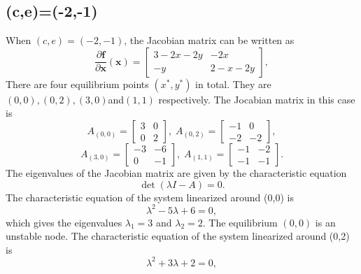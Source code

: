 \documentclass[a4paper,twocolumn]{article} %
\begin{document}
\subsection{(c,e)=(-2,-1)}
When $(c,e)=(-2,-1)$, the Jacobian matrix can be written as
\begin{equation*}
    \frac{\partial\textbf{f}}{\partial \textbf{x}}(\textbf{x}) =
    \left[\begin{array}{cc}
    3-2x-2y & -2x \\
    -y & 2-x-2y
    \end{array}\right],
\end{equation*}
There are four equilibrium points $(x^*,y^*)$ in total. They are $(0,0),(0,2),(3,0)$and$(1,1)$ respectively. The Jocabian matrix in this case is
\begin{equation*}
    A_{(0,0)} =
    \left[\begin{array}{cc}
    3 & 0 \\
    0 & 2
    \end{array}\right], \; A_{(0,2)} =
    \left[\begin{array}{cc}
    -1 & 0 \\
    -2 & -2
    \end{array}\right],   
    \end{equation*}
    \begin{equation*}
    A_{(3,0)} =
    \left[\begin{array}{cc}
    -3 & -6 \\
    0 & -1
    \end{array}\right], \;A_{(1,1)} =
    \left[\begin{array}{cc}
    -1 & -2 \\
    -1 & -1
    \end{array}\right].
\end{equation*}
The eigenvalues of the Jacobian matrix are given by the characteristic equation
\begin{equation*}
    \det(\lambda I - A) = 0.
\end{equation*}
The characteristic equation of the system linearized around \mbox{(0,0)} is
\begin{equation*}
    \lambda^2 -5 \lambda + 6 = 0,
\end{equation*}
which gives the eigenvalues $\lambda_{1} = 3$ and $\lambda_{2} = 2$. The equilibrium $(0,0)$ is an unstable node. 
The characteristic equation of the system linearized around \mbox{(0,2)} is
\begin{equation*}
    \lambda^2 +3 \lambda + 2 = 0,
\end{equation*}
\end{document}
